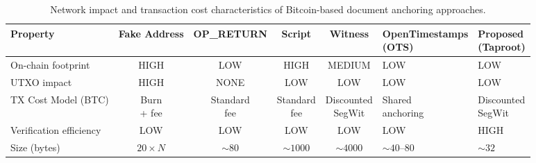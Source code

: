 \begin{table}[t]
\caption{Network impact and transaction cost characteristics of Bitcoin-based document anchoring approaches.}
\label{tab:comparative_cost}
\centering
\small
\renewcommand{\arraystretch}{1.6}

\begin{adjustbox}{max width=\linewidth}
\begin{tabular}{
>{\centering\arraybackslash}m{3.2cm}
c c c c
>{\centering\arraybackslash}m{2.8cm}
>{\centering\arraybackslash}m{2.8cm}
}
\toprule
\textbf{Property} &
\textbf{Fake Address} &
\textbf{OP\_RETURN} &
\textbf{Script} &
\textbf{Witness} &
\shortstack{\textbf{OpenTimestamps}\\(OTS)} &
\shortstack{\textbf{Proposed}\\(Taproot)} \\
\midrule

On-chain footprint &
HIGH & LOW & HIGH & MEDIUM & LOW & LOW \\

UTXO impact &
HIGH & NONE & LOW & LOW & LOW & LOW \\

TX Cost Model (BTC) &
\shortstack{Burn\\+ fee} &
\shortstack{Standard\\fee} &
\shortstack{Standard\\fee} &
\shortstack{Discounted\\SegWit} &
\shortstack{Shared\\anchoring} &
\shortstack{Discounted\\SegWit} \\

Verification efficiency &
LOW & LOW & LOW & LOW & LOW & HIGH \\

Size (bytes) &
$20\times N$ &
$\sim 80$ &
$\sim 1000$ &
$\sim 4000$ &
$\sim 40$--$80$ &
$\sim 32$ \\

\bottomrule
\end{tabular}
\end{adjustbox}

\end{table}